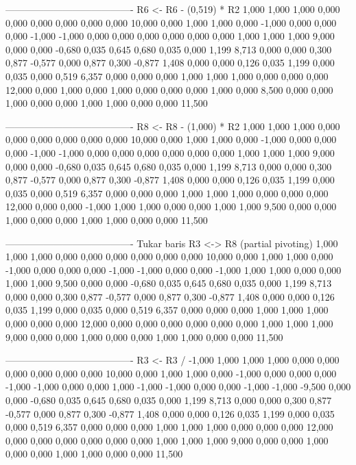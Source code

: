 \documentclass[12pt]{article}
\begin{document}
\begin{enumerate}
\begin{keluaran}
----------------------------------------
R6 <- R6 - (0,519) * R2
1,000   1,000   1,000   0,000   0,000   0,000   0,000   0,000   0,000   10,000
0,000   1,000   1,000   0,000   -1,000  0,000   0,000   0,000   -1,000  -1,000
0,000   0,000   0,000   0,000   0,000   0,000   1,000   1,000   1,000   9,000
0,000   0,000   -0,680  0,035   0,645   0,680   0,035   0,000   1,199   8,713
0,000   0,000   0,300   0,877   -0,577  0,000   0,877   0,300   -0,877  1,408
0,000   0,000   0,126   0,035   1,199   0,000   0,035   0,000   0,519   6,357
0,000   0,000   0,000   1,000   1,000   1,000   0,000   0,000   0,000   12,000
0,000   1,000   0,000   1,000   0,000   0,000   0,000   1,000   0,000   8,500
0,000   0,000   1,000   0,000   0,000   1,000   1,000   0,000   0,000   11,500

----------------------------------------
R8 <- R8 - (1,000) * R2
1,000   1,000   1,000   0,000   0,000   0,000   0,000   0,000   0,000   10,000
0,000   1,000   1,000   0,000   -1,000  0,000   0,000   0,000   -1,000  -1,000
0,000   0,000   0,000   0,000   0,000   0,000   1,000   1,000   1,000   9,000
0,000   0,000   -0,680  0,035   0,645   0,680   0,035   0,000   1,199   8,713
0,000   0,000   0,300   0,877   -0,577  0,000   0,877   0,300   -0,877  1,408
0,000   0,000   0,126   0,035   1,199   0,000   0,035   0,000   0,519   6,357
0,000   0,000   0,000   1,000   1,000   1,000   0,000   0,000   0,000   12,000
0,000   0,000   -1,000  1,000   1,000   0,000   0,000   1,000   1,000   9,500
0,000   0,000   1,000   0,000   0,000   1,000   1,000   0,000   0,000   11,500

----------------------------------------
Tukar baris R3 <-> R8 (partial pivoting)
1,000   1,000   1,000   0,000   0,000   0,000   0,000   0,000   0,000   10,000
0,000   1,000   1,000   0,000   -1,000  0,000   0,000   0,000   -1,000  -1,000
0,000   0,000   -1,000  1,000   1,000   0,000   0,000   1,000   1,000   9,500
0,000   0,000   -0,680  0,035   0,645   0,680   0,035   0,000   1,199   8,713
0,000   0,000   0,300   0,877   -0,577  0,000   0,877   0,300   -0,877  1,408
0,000   0,000   0,126   0,035   1,199   0,000   0,035   0,000   0,519   6,357
0,000   0,000   0,000   1,000   1,000   1,000   0,000   0,000   0,000   12,000
0,000   0,000   0,000   0,000   0,000   0,000   1,000   1,000   1,000   9,000
0,000   0,000   1,000   0,000   0,000   1,000   1,000   0,000   0,000   11,500

----------------------------------------
R3 <- R3 / -1,000
1,000   1,000   1,000   0,000   0,000   0,000   0,000   0,000   0,000   10,000
0,000   1,000   1,000   0,000   -1,000  0,000   0,000   0,000   -1,000  -1,000
0,000   0,000   1,000   -1,000  -1,000  0,000   0,000   -1,000  -1,000  -9,500
0,000   0,000   -0,680  0,035   0,645   0,680   0,035   0,000   1,199   8,713
0,000   0,000   0,300   0,877   -0,577  0,000   0,877   0,300   -0,877  1,408
0,000   0,000   0,126   0,035   1,199   0,000   0,035   0,000   0,519   6,357
0,000   0,000   0,000   1,000   1,000   1,000   0,000   0,000   0,000   12,000
0,000   0,000   0,000   0,000   0,000   0,000   1,000   1,000   1,000   9,000
0,000   0,000   1,000   0,000   0,000   1,000   1,000   0,000   0,000   11,500


\end{keluaran}
\end{enumerate}
\end{document}

